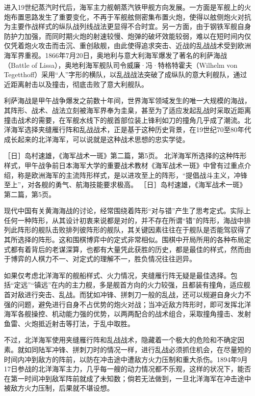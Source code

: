 \documentclass[12pt,UTF8]{ctexbook}
\begin{document}
进入19世纪蒸汽时代后，海军主力舰朝蒸汽铁甲舰方向发展。一方面是军舰上的火炮布置思路发生了重要变化，不再于军舰舷侧密集布置火炮，使得以舷侧炮火对抗为主要作战样式的纵队战列线战法更显得不合时宜。另一方面，由于钢铁军舰自身防护力加强，而同时期火炮的射速较慢、炮弹的破坏效能较弱，难以在短时间内仅仅凭着炮火攻击而击沉、重创敌舰，由此使得追求突击、近战的乱战战术受到欧洲海军界重视。1866年7月20日，奥地利与意大利海军爆发了著名的利萨海战（Battle of Lissa），奥地利海军舰队司令威廉·冯·特格特霍夫（Wilhelm von Tegetthoff）采用“人”字形的横队，以乱战战法突破了成纵队的意大利舰队，通过近距离射击以及撞击，彻底击败了意大利舰队。

利萨海战是甲午战争爆发之前数十年间，世界海军领域发生的唯一大规模的海战，其阵形、战术、战法立刻被海军界奉为圭臬，甚至为了适应发起乱战时采取近距离撞击战术的需要，在军舰水线下的舰首部位装上锋利如刀的撞角几乎成了潮流。北洋海军选择夹缝雁行阵和乱战战术，正是基于这种历史背景，在19世纪70至80年代成长起来的北洋海军，可以说就是这种战术思想的忠实学徒。

［日］岛村速雄，《海军战术一斑》第二篇，第5页。
北洋海军所选择的这种阵形样式，甲午战争前日本海军大学的重要战术教材《海军战术一斑》中曾有过重点介绍，称是欧洲海军的主流阵形样式，是以进攻至上的阵形，“提倡战斗主义，冲锋至上”，对各舰的勇气、航海技能要求极高。 ［日］岛村速雄，《海军战术一斑》第二篇，第5页。

现代中国有关黄海海战的讨论，经常围绕着阵形“对与错”产生了思考定式。实际上任何一种阵形，从其设计初衷来说都是对的，并不存在所谓“错”的阵形，海战中排列此阵形的舰队击败排列彼阵形的舰队，其关键因素往往在于舰队是否能驾驭得了其所选择的阵形。这和围棋博弈中的定式非常相似。围棋中开局所用的各种布局定式都有着背后的老谋深算，也都有大量凭此获胜的历史，都是最佳的样式，然而由于博弈的人棋力不一、对定式的理解不一，胜负情况往往迥异。

如果仅考虑北洋海军的舰船样式、火力情况，夹缝雁行阵无疑是最佳选择。包括“定远”“镇远”在内的主力舰，多是舰首方向的火力较强，且都装有撞角，适应舰首对敌进行突击、乱战。而犹如冲锋、拼刺刀一般的乱战，还可以规避自身火力不强的问题，避免进行自身不占优势的炮火对战；当冲近敌方阵形时，即可发挥北洋海军各舰操控、机动能力强的优势，以两两配合的战术组合，采取撞角撞击、发射鱼雷、火炮抵近射击等打法，于乱中取胜。

不过，北洋海军使用夹缝雁行阵和乱战战术，隐藏着一个极大的危险和不确定因素。就如同陆军冲锋、拼刺刀时的情况一样，进行乱战必须抓住机会，在尽量短的时间内冲到敌方的阵前，以防在冲击途中遭敌方火力压制和重大杀伤。1894年9月17日参战的北洋海军主力，几乎每一艘的动力情况都不乐观，这样的状况下，能否在第一时间冲到敌军阵前就成了未知数；倘若无法做到，一旦北洋海军在冲击途中被敌方火力压制，后果就不堪设想。
\end{document}
